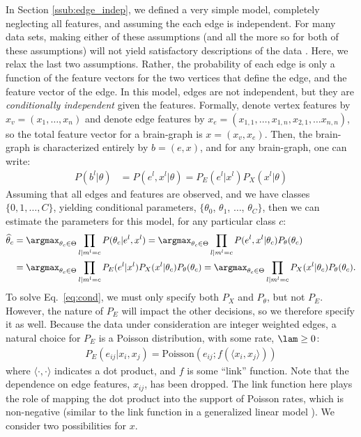 In Section \ref{ssub:edge_indep}, we defined a very simple model, completely neglecting all features, and assuming the each edge is independent.  For many data sets, making either of these assumptions (and all the more so for both of these assumptions) will not yield satisfactory descriptions of the data \cite{?}.  Here, we relax the last two assumptions.  Rather, the probability of each edge is only a function of the feature vectors for the two vertices that define the edge, and the feature vector of the edge.  In this model, edges are not independent, but they are \emph{conditionally independent} given the features.   Formally, denote vertex features by $x_v=(x_1, \ldots, x_{n})$ and denote edge features by $x_e=(x_{1,1}, \ldots, x_{1,n}, x_{2,1}, \ldots x_{n,n})$, so the total feature vector for a brain-graph is $x=(x_v, x_e)$.  Then, the brain-graph is characterized entirely by $b=(e,x)$, and for any brain-graph, one can write:
\begin{align}
	P(b^l | \theta) &= P(e^l, x^l | \theta) = P_E(e^l | x^l) P_X(x^l | \theta) 
\end{align}
Assuming that all edges and features are observed, and we have classes $\{0,1,\ldots,C\}$, yielding conditional parameters, $\{\theta_0$, $\theta_1$, $\ldots$, $\theta_C\}$, then we can estimate the parameters for this model, for any particular class $c$:
\begin{align}
\widehat{\theta}_c 	&= \argmax_{\theta_c \in \Theta} \prod_{l | m^l=c} P(\theta_c | e^l, x^l) %
		= \argmax_{\theta_c \in \Theta} \prod_{l | m^l=c} P(e^l, x^l | \theta_c) P_{\theta}(\theta_c) \nonumber \\
		&= \argmax_{\theta_c \in \Theta} \prod_{l | m^l=c} P_E(e^l | x^l) P_X(x^l | \theta_c) P_{\theta}(\theta_c) 					 					
		= \argmax_{\theta_c \in \Theta} \prod_{l | m^l=c}  P_X(x^l | \theta_c) P_{\theta}(\theta_c).  \label{eq:cond}
\end{align}
To solve Eq.~\ref{eq:cond}, we must only specify both $P_X$ and $P_{\theta}$, but not $P_E$.  However, the nature of $P_E$ will impact the other decisions, so we therefore specify it as well.  Because the data under consideration are integer weighted edges, a natural choice for $P_E$ is a Poisson distribution, with some rate, $\lam \geq 0$:
\begin{align} \label{eq:E}
	P_E(e_{ij} | x_i,x_j) = \text{Poisson}(e_{ij}; f(\langle x_i, x_j \rangle))
\end{align}
where $\langle \cdot, \cdot \rangle$ indicates a dot product, and $f$ is some ``link'' function.  Note that the dependence on edge features, $x_{ij}$, has been dropped.  The link function here plays the role of mapping the dot product into the support of Poisson rates, which is non-negative (similar to the link function in a generalized linear model \cite{McCullaghNelder89}).  We consider two possibilities for $x$.

